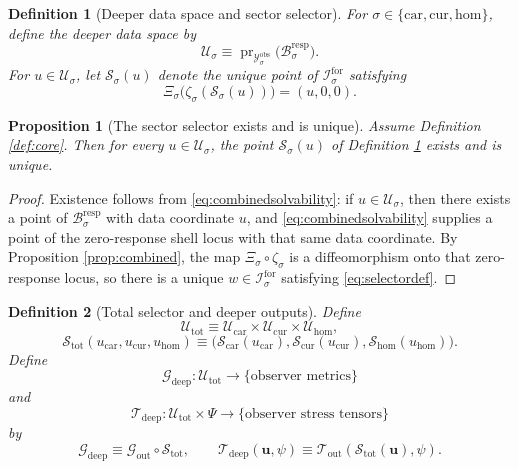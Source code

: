 \documentclass[11pt]{article}
\newcommand{\Car}{\mathrm{car}}
\newcommand{\Cur}{\mathrm{cur}}
\newcommand{\Hom}{\mathrm{hom}}
\newcommand{\ForSpace}[1]{\mathcal I_{#1}^{\mathrm{for}}}
\newcommand{\MetricOut}{\mathscr G_{\mathrm{out}}}
\newcommand{\MatterOut}{\mathscr T_{\mathrm{out}}}
\newcommand{\DeepMetricOut}{\mathscr G_{\mathrm{deep}}}
\newcommand{\DeepMatterOut}{\mathscr T_{\mathrm{deep}}}
\newcommand{\DataSpace}[1]{\mathcal Y_{#1}^{\mathrm{obs}}}
\newcommand{\ResponseMap}[1]{\Xi_{#1}}
\newcommand{\ResponseImage}[1]{\mathcal B_{#1}^{\mathrm{resp}}}
\newcommand{\ProtoEmbed}[1]{\zeta_{#1}}
\newcommand{\DeepSpace}[1]{\mathcal U_{#1}}
\newcommand{\ChainSelect}[1]{\mathcal S_{#1}}
\newcommand{\DeepShell}{\mathcal U_{\mathrm{tot}}}
\newcommand{\ChainSelectTriple}{\mathcal S_{\mathrm{tot}}}
\newtheorem{definition}{Definition}
\newtheorem{proposition}{Proposition}
\begin{document}
\begin{definition}[Deeper data space and sector selector]
\label{def:selector}
For \(\sigma\in\{\Car,\Cur,\Hom\}\), define the deeper data space by
\[
\DeepSpace{\sigma}
\equiv
\operatorname{pr}_{\DataSpace{\sigma}}\bigl(\ResponseImage{\sigma}\bigr).
\]
For \(u\in \DeepSpace{\sigma}\), let \(\ChainSelect{\sigma}(u)\) denote the unique point of \(\ForSpace{\sigma}\) satisfying
\begin{equation}
\ResponseMap{\sigma}\bigl(\ProtoEmbed{\sigma}(\ChainSelect{\sigma}(u))\bigr)
=(u,0,0).
\label{eq:selectordef}
\end{equation}
\end{definition}

\begin{proposition}[The sector selector exists and is unique]
\label{prop:selector}
Assume Definition \ref{def:core}. Then for every \(u\in\DeepSpace{\sigma}\), the point \(\ChainSelect{\sigma}(u)\) of Definition \ref{def:selector} exists and is unique.
\end{proposition}

\begin{proof}
Existence follows from \eqref{eq:combinedsolvability}: if \(u\in\DeepSpace{\sigma}\), then there exists a point of \(\ResponseImage{\sigma}\) with data coordinate \(u\), and \eqref{eq:combinedsolvability} supplies a point of the zero-response shell locus with that same data coordinate. By Proposition \ref{prop:combined}, the map \(\ResponseMap{\sigma}\circ\ProtoEmbed{\sigma}\) is a diffeomorphism onto that zero-response locus, so there is a unique \(w\in\ForSpace{\sigma}\) satisfying \eqref{eq:selectordef}.
\end{proof}

\begin{definition}[Total selector and deeper outputs]
\label{def:deepoutputs}
Define
\[
\DeepShell
\equiv
\DeepSpace{\Car}\times\DeepSpace{\Cur}\times\DeepSpace{\Hom},
\]
\[
\ChainSelectTriple(u_{\Car},u_{\Cur},u_{\Hom})
\equiv
\bigl(
\ChainSelect{\Car}(u_{\Car}),
\ChainSelect{\Cur}(u_{\Cur}),
\ChainSelect{\Hom}(u_{\Hom})
\bigr).
\]
Define
\[
\DeepMetricOut:\DeepShell\to\{\text{observer metrics}\}
\]
and
\[
\DeepMatterOut:\DeepShell\times\Psi\to\{\text{observer stress tensors}\}
\]
by
\begin{equation}
\DeepMetricOut
\equiv
\MetricOut\circ\ChainSelectTriple,
\qquad
\DeepMatterOut(\mathbf u,\psi)
\equiv
\MatterOut(\ChainSelectTriple(\mathbf u),\psi).
\label{eq:deepoutputs}
\end{equation}
\end{definition}
\end{document}
